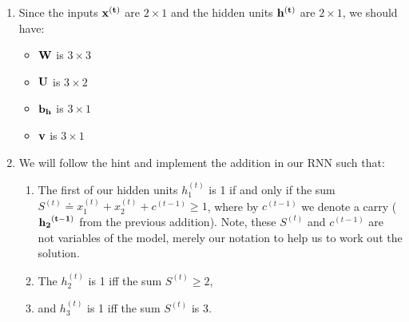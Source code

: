 \documentclass[
  letterpaper,
  DIV=11,
  numbers=noendperiod]{scrartcl}
\providecommand{\tightlist}{%
  \setlength{\itemsep}{0pt}\setlength{\parskip}{0pt}}
\begin{document}
\begin{enumerate}
\def\labelenumi{(\alph{enumi})}
\item
  Since the inputs \(\bf{x}^{(t)}\) are \(2 \times 1\) and the hidden
  units \(\bf{h}^{(t)}\) are \(2 \times 1\), we should have:

  \begin{itemize}
  \tightlist
  \item
    \(\bf{W}\) is \(3 \times 3\)
  \item
    \(\bf{U}\) is \(3 \times 2\)
  \item
    \(\bf{b}_h\) is \(3 \times 1\)
  \item
    \(\bf{v}\) is \(3 \times 1\)
  \end{itemize}
\item
  We will follow the hint and implement the addition in our RNN such
  that:

  \begin{enumerate}
  \def\labelenumii{\arabic{enumii}.}
  \tightlist
  \item
    The first of our hidden units \(h_1^{(t)}\) is 1 if and only if the
    sum \(S^{(t)} \doteq x_1^{(t)} + x_2^{(t)} + c^{(t-1)} \geq 1\),
    where by \(c^{(t-1)}\) we denote a carry (\(\bf{h_2}^{(t-1)}\) from
    the previous addition). Note, these \(S^{(t)}\) and \(c^{(t-1)}\)
    are not variables of the model, merely our notation to help us to
    work out the solution.
  \item
    The \(h_2^{(t)}\) is 1 iff the sum \(S^{(t)} \geq 2\),
  \item
    and \(h_3^{(t)}\) is 1 iff the sum \(S^{(t)}\) is 3.
  \end{enumerate}


\end{enumerate}
\end{document}

